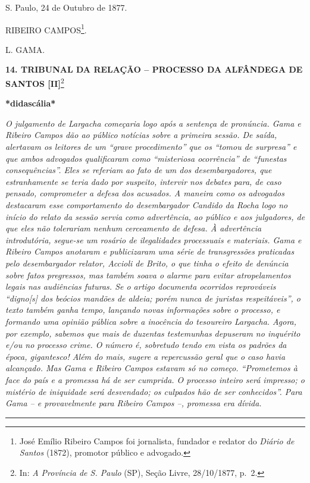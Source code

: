 S. Paulo, 24 de Outubro de 1877.

RIBEIRO CAMPOS\footnote{José Emílio Ribeiro Campos foi jornalista,
  fundador e redator do \emph{Diário de Santos} (1872), promotor público
  e advogado.}.

L. GAMA.

\textbf{14. TRIBUNAL DA RELAÇÃO -- PROCESSO DA ALFÂNDEGA DE SANTOS
{[}II{]}}\footnote{In: \emph{A Província de S. Paulo} (SP), Seção Livre,
  28/10/1877, p.~2.}

\textbf{*didascália*}

\emph{O julgamento de Largacha começaria logo após a sentença de
pronúncia. Gama e Ribeiro Campos dão ao público notícias sobre a
primeira sessão. De saída, alertavam os leitores de um ``grave
procedimento'' que os ``tomou de surpresa'' e que ambos advogados
qualificaram como ``misteriosa ocorrência'' de ``funestas
consequências''. Eles se referiam ao fato de um dos desembargadores, que
estranhamente se teria dado por suspeito, intervir nos debates para, de
caso pensado, comprometer a defesa dos acusados. A maneira como os
advogados destacaram esse comportamento do desembargador Candido da
Rocha logo no início do relato da sessão servia como advertência, ao
público e aos julgadores, de que eles não tolerariam nenhum cerceamento
de defesa. À advertência introdutória, segue-se um rosário de
ilegalidades processuais e materiais. Gama e Ribeiro Campos anotaram e
publicizaram uma série de transgressões praticadas pelo desembargador
relator, Accioli de Brito, o que tinha o efeito de denúncia sobre fatos
pregressos, mas também soava o alarme para evitar atropelamentos legais
nas audiências futuras. Se o artigo documenta ocorridos reprováveis
``digno{[}s{]} dos beócios mandões de aldeia; porém nunca de juristas
respeitáveis'', o texto também ganha tempo, lançando novas informações
sobre o processo, e formando uma opinião pública sobre a inocência do
tesoureiro Largacha. Agora, por exemplo, sabemos que mais de duzentas
testemunhas depuseram no inquérito e/ou no processo crime. O número é,
sobretudo tendo em vista os padrões da época, gigantesco! Além do mais,
sugere a repercussão geral que o caso havia alcançado. Mas Gama e
Ribeiro Campos estavam só no começo. ``Prometemos à face do país e a
promessa há de ser cumprida. O processo inteiro será impresso; o
mistério de iniquidade será desvendado; os culpados hão de ser
conhecidos''. Para Gama -- e provavelmente para Ribeiro Campos --,
promessa era dívida.}

\begin{center}\rule{0.5\linewidth}{\linethickness}\end{center}

